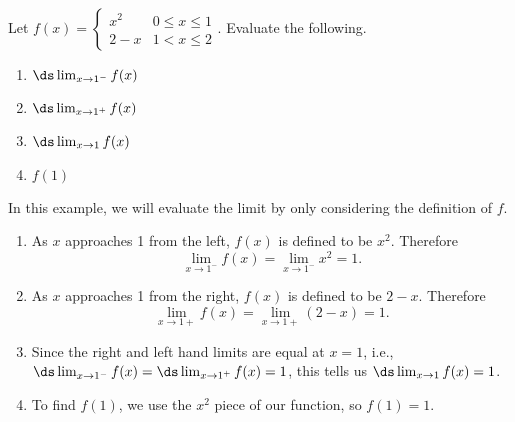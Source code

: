 \begin{example}\label{ex_onesided}
Let $f(x) = \begin{cases} x^2 & 0\leq x\leq 1 \\ 2-x & 1<x\leq 2\end{cases}.$ Evaluate the following.
\begin{multicols}{2}
	\begin{enumerate}
		\item	$\ds \lim_{x\to 1^-} f(x)$
		\item	$\ds \lim_{x\to 1^+} f(x)$
		\item	$\ds \lim_{x\to 1} f(x)$
		\item	$f(1)$
	\end{enumerate}
\end{multicols}
\solution
In this example, we will evaluate the limit by only considering the definition of $f$.
\begin{enumerate}
	\item	As $x$ approaches 1 from the left, $f(x)$ is defined to be $x^2$. Therefore \[\lim_{x\to1^-} f(x)=\lim_{x\to1^-} x^2=1.\]
	\item	As $x$ approaches 1 from the right, $f(x)$ is defined to be $2-x$. Therefore \[\lim_{x\to 1+} f(x)=\lim_{x\to 1+}(2-x)=1.\]
	\item	Since the right and left hand limits are equal at $x=1$, i.e., $\ds \lim_{x\to1^-} f(x)=\ds \lim_{x\to1^+} f(x)=1$, this tells us $\ds \lim_{x\to1} f(x)=1$.
	\item	To find $f(1)$, we use the $x^2$ piece of our function, so $f(1)=1$.
\end{enumerate}
\end{example}

